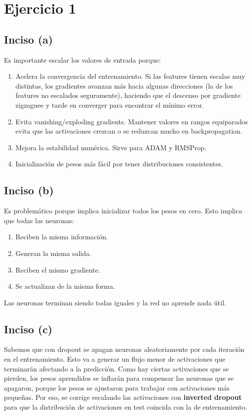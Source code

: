 \documentclass[12pt, a4paper]{article}
\begin{document}
    \section*{Ejercicio 1}
        \subsection*{Inciso (a)}
            \noindent Es importante escalar los valores de entrada porque:
            \begin{enumerate}
                \item Acelera la convergencia del entrenamiento. Si las features tienen escalas muy distintas, los gradientes avanzan más hacia algunas direcciones (la de los features no escalados seguramente), haciendo que el descenso por gradiente zigzaguee y tarde en converger para encontrar el mínimo error.
                \item Evita vanishing/exploding gradients. Mantener valores en rangos equiparados evita que las activaciones crezcan o se reduzcan mucho en backpropagation.
                \item Mejora la estabilidad numérica. Sirve para ADAM y RMSProp.
                \item Inicialización de pesos más fácil por tener distribuciones consistentes.
            \end{enumerate}
        \subsection*{Inciso (b)}
            \noindent Es problemático porque implica inicializar todos los pesos en cero. Esto implica que todas las neuronas:
            \begin{enumerate}
                \item Reciben la misma información. 
                \item Generan la misma salida.
                \item Reciben el mismo gradiente.
                \item Se actualizan de la misma forma.
            \end{enumerate}
            \noindent Las neuronas terminan siendo todas iguales y la red no aprende nada útil.
        \subsection*{Inciso (c)}
            \noindent Sabemos que con dropout se apagan neuronas aleatoriamente por cada iteración en el entrenamiento. Esto va a generar un flujo menor de activaciones que terminarán afectando a la predicción. Como hay ciertas activaciones que se pierden, los pesos aprendidos se inflarán para compensar las neuronas que se apagaron, porque los pesos se ajustaron para trabajar con activaciones más pequeñas. Por eso, se corrige escalando las activaciones con \textbf{inverted dropout} para que la distribución de activaciones en test coincida con la de entrenamiento.
\end{document}
